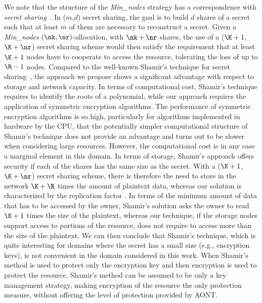 {We note that the structure of the {\em Min\_nodes\/} strategy has a
correspondence with {\em secret sharing}~\cite{shamir1979share}. In
($m$,$d$) secret sharing, the goal is to build $d$ shares of a secret
such that at least $m$ of them are necessary to reconstruct a
secret. Given a {\em Min\_nodes\/} $(\nk,\nr)$-allocation, with
$\nk+\nr$ shares, the use of a ($\K+1$, $\K+\nr$) secret sharing
scheme would then satisfy the requirement that at least $\K+1$ nodes
have to cooperate to access the resource, tolerating the loss of up to
$\R-1$ nodes. Compared to the well-known Shamir's technique for secret
sharing~\cite{shamir1979share}, the approach we propose shows a
significant advantage with respect to storage and network capacity. In
terms of computational cost, Shamir's technique requires to identify
the roots of a polynomial, while our approach requires the application
of symmetric encryption algorithms. The performance of symmetric
encryption algorithms is so high, particularly for algorithms
implemented in hardware by the CPU, that the potentially simpler
computational structure of Shamir's technique does not provide an
advantage and turns out to be slower when considering large
resources. However, the computational cost is in any case a marginal
element in this domain. In terms of storage, Shamir's approach offers
security if each of the shares has the same size as the secret. With a
($\K+1$, $\K+\nr$) secret sharing scheme, there is therefore the need
to store in the network $\K+\R$ times the amount of plaintext data,
whereas our solution is characterized by the replication factor \R.
In terms of the minimum amount of data that has to be accessed by the
owner, Shamir's solution asks the owner to read $\K+1$ times the size
of the plaintext, whereas our technique, if the storage nodes support
access to portions of the resource, does not require to access more
than the size of the plaintext.  We can then conclude that Shamir's
technique, which is quite interesting for domains where the secret has
a small size (e.g., encryption keys), is not convenient in the domain
considered in this work. When Shamir's method is used to protect only
the encryption key and then encryption is used to protect the
resource, Shamir's method can be assumed to be only a key management
strategy, making encryption of the resource the only protection
measure, without offering the level of protection provided by AONT.

}
